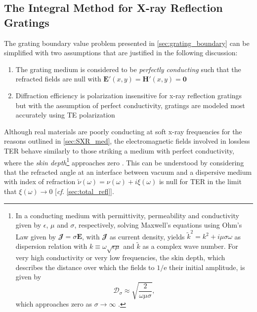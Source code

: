 \subsection{The Integral Method for X-ray Reflection Gratings}\label{sec:grat_bound_consider}
The grating boundary value problem presented in \cref{sec:grating_boundary} can be simplified with two assumptions that are justified in the following discussion:
\begin{enumerate}[noitemsep]
	\item The grating medium is considered to be \emph{perfectly conducting} such that the refracted fields are null with $\mathbold{E'} \left( x, y \right) = \mathbold{H'} \left( x, y \right) = \mathbf{0}$
	\item Diffraction efficiency is polarization insensitive for x-ray reflection gratings but with the assumption of perfect conductivity, gratings are modeled most accurately using TE polarization \cite{Marlowe16}
 \end{enumerate}
Although real materials are poorly conducting at soft x-ray frequencies for the reasons outlined in \cref{sec:SXR_med}, the electromagnetic fields involved in lossless TER behave similarly to those striking a medium with perfect conductivity, where the \emph{skin depth}\footnote{In a conducting medium with permittivity, permeability and conductivity given by $\epsilon$, $\mu$ and $\sigma$, respectively, solving Maxwell's equations using Ohm's Law given by $\mathbfcal{J} = \sigma \mathbold{E}$, with $\mathbfcal{J}$ as current density, yields $\tilde{k}^2 = k^2 + i \mu \sigma \omega$ as dispersion relation with $k \equiv \omega \sqrt{\epsilon \mu}$ and $\tilde{k}$ as a complex wave number. For very high conductivity or very low frequencies, the skin depth, which describes the distance over which the fields to $1/\mathrm{e}$ their initial amplitude, is given by 
\begin{equation*}
 \mathcal{D}_{\sigma} \approx \sqrt{\frac{2}{\omega \mu \sigma}} ,
 \end{equation*}
which approaches zero as $\sigma \to \infty$ \cite{Landau60}.\label{footnote:skin_depth}}
approaches zero \cite{Griffiths17,Jackson75}. 
This can be understood by considering that the refracted angle at an interface between vacuum and a dispersive medium with index of refraction $\tilde{\nu}(\omega) = \nu (\omega) + i \xi (\omega)$ is null for TER in the limit that $\xi (\omega) \to 0$ [\emph{cf.\@} \cref{sec:total_refl}]. 
